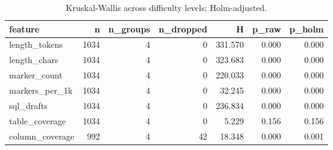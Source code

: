 \begin{table}[htbp]
\caption{Kruskal-Wallis across difficulty levels; Holm-adjusted.}
\label{tab:task2_kruskal}
\begin{tabular}{lrrrrrr}
\toprule
feature & n & n\_groups & n\_dropped & H & p\_raw & p\_holm \\
\midrule
length_tokens & 1034 & 4 & 0 & 331.570 & 0.000 & 0.000 \\
length_chars & 1034 & 4 & 0 & 323.683 & 0.000 & 0.000 \\
marker_count & 1034 & 4 & 0 & 220.033 & 0.000 & 0.000 \\
markers_per_1k & 1034 & 4 & 0 & 32.245 & 0.000 & 0.000 \\
sql_drafts & 1034 & 4 & 0 & 236.834 & 0.000 & 0.000 \\
table_coverage & 1034 & 4 & 0 & 5.229 & 0.156 & 0.156 \\
column_coverage & 992 & 4 & 42 & 18.348 & 0.000 & 0.001 \\
\bottomrule
\end{tabular}
\end{table}

